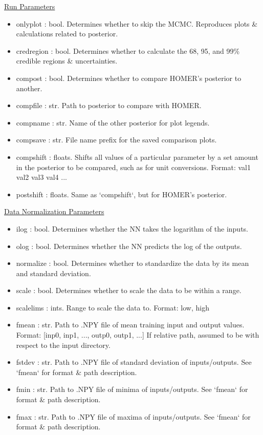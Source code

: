 \documentclass[letterpaper, 12pt]{article}
\begin{document}
\noindent \underline{Run Parameters}
\begin{itemize}
\item onlyplot    : bool. Determines whether to skip the MCMC.
                    Reproduces plots \& calculations related to posterior.
\item credregion  : bool. Determines whether to calculate the 68, 95, and 99\% 
                    credible regions \& uncertainties.
\item compost     : bool. Determines whether to compare HOMER's posterior to 
                          another.
\item compfile    : str.  Path to posterior to compare with HOMER.
\item compname    : str.  Name of the other posterior for plot legends.
\item compsave    : str.  File name prefix for the saved comparison plots.
\item compshift   : floats. Shifts all values of a particular parameter by a 
                          set amount in the posterior to be compared, such as 
                          for unit conversions.
                    Format: val1 val2 val3 val4 ...
\item postshift   : floats. Same as `compshift`, but for HOMER's posterior.
\end{itemize}


\noindent \underline{Data Normalization Parameters}
\begin{itemize}
\item ilog        : bool. Determines whether the NN takes the logarithm of the 
                          inputs.
\item olog        : bool. Determines whether the NN predicts the log of the 
                          outputs.
\item normalize   : bool. Determines whether to standardize the data by its 
                          mean and standard deviation.
\item scale       : bool. Determines whether to scale the data to be within a 
                          range.
\item scalelims   : ints. Range to scale the data to.
                          Format: low, high
\item fmean       : str.  Path to .NPY file of mean training input and output 
                          values.
                          Format: [inp0, inp1, ..., outp0, outp1, ...]
                          If relative path, assumed to be with respect to the 
                          input directory.
\item fstdev      : str.  Path to .NPY file of standard deviation of 
                          inputs/outputs.
                          See `fmean` for format \& path description.
\item fmin        : str.  Path to .NPY file of minima of inputs/outputs.
                          See `fmean` for format \& path description.
\item fmax        : str.  Path to .NPY file of maxima of inputs/outputs.
                          See `fmean` for format \& path description.
\end{itemize}
\end{document}
